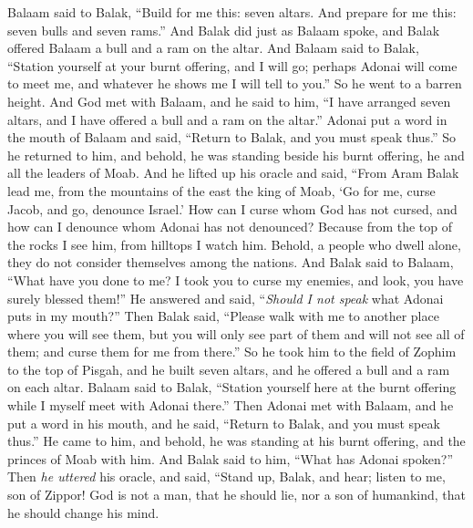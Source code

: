 \begin{biblechapter} %
 Balaam said to Balak, “Build for me this: seven altars. And prepare for me this: seven bulls and seven rams.”
\verse And Balak did just as Balaam spoke, and Balak offered Balaam a bull and a ram on the altar.
\verse And Balaam said to Balak, “Station yourself at your burnt offering, and I will go; perhaps Adonai will come to meet me, and whatever he shows me I will tell to you.” So he went to a barren height.
\verse And God met with Balaam, and he said to him, “I have arranged seven altars, and I have offered a bull and a ram on the altar.”
\verse Adonai put a word in the mouth of Balaam and said, “Return to Balak, and you must speak thus.”
\verse So he returned to him, and behold, he was standing beside his burnt offering, he and all the leaders of Moab.
\verse And he lifted up his oracle and said,
\verse “From Aram Balak lead me, 
from the mountains of the east the king of Moab, 
‘Go for me, curse Jacob, 
and go, denounce Israel.’
\verse How can I curse whom God has not cursed, 
and how can I denounce whom Adonai has not denounced?
\verse Because from the top of the rocks I see him, 
from hilltops I watch him. 
Behold, a people who dwell alone, 
they do not consider themselves among the nations.
\verse And Balak said to Balaam, “What have you done to me? I took you to curse my enemies, and look, you have surely blessed them!”
\verse He answered and said, “\textit{Should I not speak} what Adonai puts in my mouth?”
\verse Then Balak said, “Please walk with me to another place where you will see them, but you will only see part of them and will not see all of them; and curse them for me from there.”
\verse So he took him to the field of Zophim to the top of Pisgah, and he built seven altars, and he offered a bull and a ram on each altar.
\verse Balaam said to Balak, “Station yourself here at the burnt offering while I myself meet with Adonai there.”
\verse Then Adonai met with Balaam, and he put a word in his mouth, and he said, “Return to Balak, and you must speak thus.”
\verse He came to him, and behold, he was standing at his burnt offering, and the princes of Moab with him. And Balak said to him, “What has Adonai spoken?”
\verse Then \textit{he uttered} his oracle, and said,
\verse “Stand up, Balak, and hear; 
listen to me, son of Zippor!
\verse God is not a man, that he should lie, 
nor a son of humankind, 
that he should change his mind. 

\end{biblechapter}
